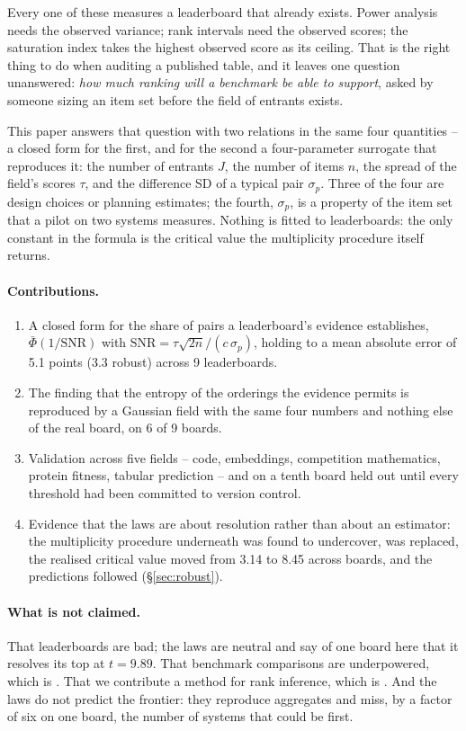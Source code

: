 \documentclass[10pt]{article}
\begin{document}
Every one of these measures a leaderboard that already exists. Power
analysis needs the observed variance; rank intervals need the observed
scores; the saturation index takes the highest observed score as its
ceiling. That is the right thing to do when auditing a published table, and
it leaves one question unanswered: \emph{how much ranking will a benchmark
be able to support}, asked by someone sizing an item set before the field
of entrants exists.

This paper answers that question with two relations in the same four
quantities -- a closed form for the first, and for the second a
four-parameter surrogate that reproduces it:
the number of entrants $J$, the number of items $n$, the spread of the
field's scores $\tau$, and the difference SD of a typical pair $\sigma_p$.
Three of the four are design choices or planning estimates; the fourth,
$\sigma_p$, is a property of the item set that a pilot on two systems
measures. Nothing is fitted to leaderboards: the only constant in the
formula is the critical value the multiplicity procedure itself returns.

\paragraph{Contributions.}
\begin{enumerate}
\item A closed form for the share of pairs a leaderboard's evidence
  establishes, $\bar\Phi(1/\mathrm{SNR})$ with
  $\mathrm{SNR} = \tau\sqrt{2n}/(c\,\sigma_p)$, holding to a mean absolute
  error of 5.1 points (3.3 robust) across 9 leaderboards.
\item The finding that the entropy of the orderings the evidence permits is
  reproduced by a Gaussian field with the same four numbers and nothing else
  of the real board, on 6 of 9 boards.
\item Validation across five fields -- code, embeddings, competition
  mathematics, protein fitness, tabular prediction -- and on a tenth board
  held out until every threshold had been committed to version control.
\item Evidence that the laws are about resolution rather than about an
  estimator: the multiplicity procedure underneath was found to undercover,
  was replaced, the realised critical value moved from 3.14 to 8.45 across
  boards, and the predictions followed (\S\ref{sec:robust}).
\end{enumerate}

\paragraph{What is not claimed.} That leaderboards are bad; the laws are
neutral and say of one board here that it resolves its top at $t = 9.89$.
That benchmark comparisons are underpowered, which is \citet{card2020}.
That we contribute a method for rank inference, which is
\citet{mogstad2024}. And the laws do not predict the frontier: they
reproduce aggregates and miss, by a factor of six on one board, the number
of systems that could be first.
\end{document}
